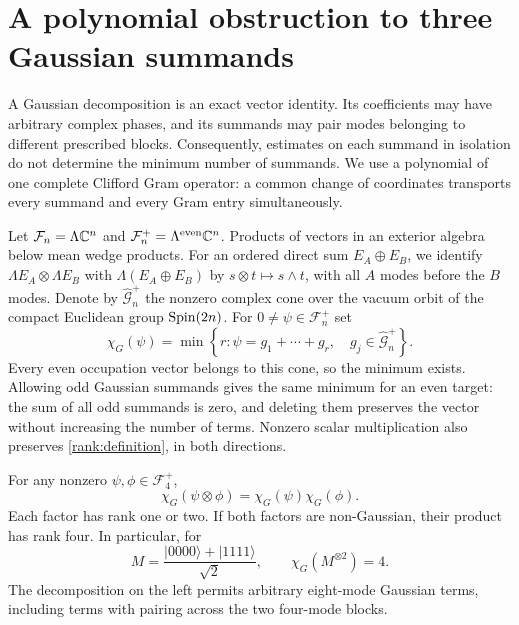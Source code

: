 \section{A polynomial obstruction to three Gaussian summands}
\label{sec:gaussian-rank}

A Gaussian decomposition is an exact vector identity. Its coefficients may
have arbitrary complex phases, and its summands may pair modes belonging to
different prescribed blocks. Consequently, estimates on each summand in
isolation do not determine the minimum number of summands. We use a
polynomial of one complete Clifford Gram operator: a common change of
coordinates transports every summand and every Gram entry simultaneously.

Let $\mathcal F_n=\Lambda\mathbb C^n$ and
$\mathcal F_n^+=\Lambda^{\mathrm{even}}\mathbb C^n$.
Products of vectors in an exterior algebra below mean wedge products.
For an ordered direct sum $E_A\oplus E_B$, we identify
$\Lambda E_A\otimes\Lambda E_B$ with $\Lambda(E_A\oplus E_B)$ by
$s\otimes t\mapsto s\wedge t$, with all $A$ modes before the $B$ modes.
Denote by
$\widehat{\mathcal G}_n^+$ the nonzero complex cone over the vacuum orbit of
the compact Euclidean group $\operatorname{Spin}(2n)$. For $0\ne\psi\in\mathcal F_n^+$ set
\begin{equation}
 \chi_G(\psi)=\min\left\{r:\psi=g_1+\cdots+g_r,
                 \quad g_j\in\widehat{\mathcal G}_n^+\right\}.
 \label{rank:definition}
\end{equation}
Every even occupation vector belongs to this cone, so the minimum exists.
Allowing odd Gaussian summands gives the same minimum for an even target:
the sum of all odd summands is zero, and deleting them preserves the vector
without increasing the number of terms. Nonzero scalar multiplication also
preserves \eqref{rank:definition}, in both directions.

\begin{theorem}\label{rank:main}
For any nonzero $\psi,\phi\in\mathcal F_4^+$,
\begin{equation}
 \chi_G(\psi\otimes\phi)=\chi_G(\psi)\chi_G(\phi).
 \label{rank:multiplicativity}
\end{equation}
Each factor has rank one or two. If both factors are non-Gaussian, their
product has rank four. In particular, for
\[
 M=\frac{|0000\rangle+|1111\rangle}{\sqrt2},
 \qquad \chi_G(M^{\otimes2})=4.
\]
The decomposition on the left permits arbitrary eight-mode Gaussian terms,
including terms with pairing across the two four-mode blocks.
\end{theorem}

